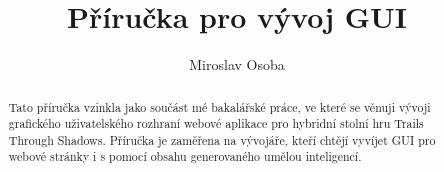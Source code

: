 \documentclass[12pt,a4paper]{article}
\title{Příručka pro vývoj GUI}
\author{Miroslav Osoba}
\begin{document}
\maketitle %

\begin{abstract}
  Tato příručka vzinkla jako součást mé bakalářské práce, ve které se věnuji vývoji grafického uživatelského rozhraní webové aplikace pro hybridní stolní hru Trails Through Shadows. Příručka je zaměřena na vývojáře, kteří chtějí vyvíjet GUI pro webové stránky i s pomocí obsahu generovaného umělou inteligencí.
\end{abstract}

\tableofcontents %

\newpage

\end{document}
